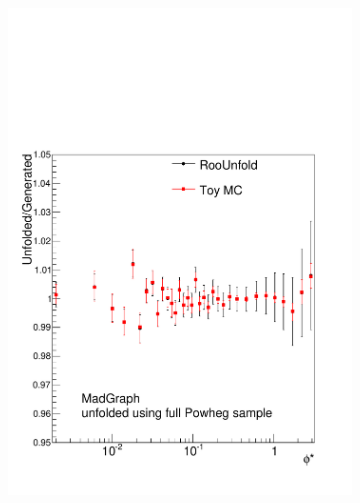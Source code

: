 \begin{figure}[!htbp]
    \centering
    \begin{subfigure}[b]{\SideBySidePlotWidth}
        \includegraphics[width=\textwidth]{figures/BinM_PM_ALL.pdf}
        \caption{}
        \label{fig:unfolding_madgraph_with_all}
    \end{subfigure}%
    \begin{subfigure}[b]{\SideBySidePlotWidth}

\end{subfigure}
\end{figure}

